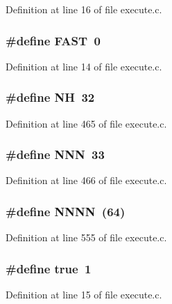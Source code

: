 Definition at line 16 of file execute.\+c.

\subsubsection[{F\+A\+ST}]{\setlength{\rightskip}{0pt plus 5cm}\#define F\+A\+ST~0}\label{execute_8c_a8091c2bcff55cbe0a4a145fd5fb7c22d}


Definition at line 14 of file execute.\+c.

\subsubsection[{NH}]{\setlength{\rightskip}{0pt plus 5cm}\#define NH~32}\label{execute_8c_abc3b05033963c7a33d28a9fc29835b6c}


Definition at line 465 of file execute.\+c.

\subsubsection[{N\+NN}]{\setlength{\rightskip}{0pt plus 5cm}\#define N\+NN~33}\label{execute_8c_ae4d7ec6f9f31fae66711f63fa5c26805}


Definition at line 466 of file execute.\+c.

\subsubsection[{N\+N\+NN}]{\setlength{\rightskip}{0pt plus 5cm}\#define N\+N\+NN~(64)}\label{execute_8c_afdad8e3654b5f02ff4c50fcb88f6eed9}


Definition at line 555 of file execute.\+c.

\subsubsection[{true}]{\setlength{\rightskip}{0pt plus 5cm}\#define true~1}\label{execute_8c_a41f9c5fb8b08eb5dc3edce4dcb37fee7}


Definition at line 15 of file execute.\+c.



